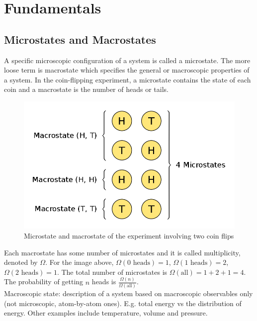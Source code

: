 \section{Fundamentals}

\subsection{Microstates and Macrostates}

A specific microscopic configuration of a system is called a microstate. The more loose term is macrostate which specifies the general or macroscopic properties of a system. In the coin-flipping experiment, a microstate contains the state of each coin and a macrostate is the number of heads or tails.

\begin{figure}[H]
	\centering
	\includegraphics[width=120mm]{5.png}
	\caption{Microstate and macrostate of the experiment involving two coin flips}
\end{figure}

Each macrostate has some number of microstates and it is called multiplicity, denoted by $\Omega$. For the image above, $\Omega(\text{0 heads})=1$, $\Omega(\text{1 heads})=2$, $\Omega(\text{2 heads})=1$. The total number of microstates is $\Omega(\text{all})=1+2+1=4$. The probability of getting $n$ heads is $\frac{\Omega(n)}{\Omega(\text{all})}$. \\

Macroscopic state: description of a system based on macroscopic observables only (not microscopic, atom-by-atom ones). E.g. total energy vs the distribution of energy. Other examples include temperature, volume and pressure.

